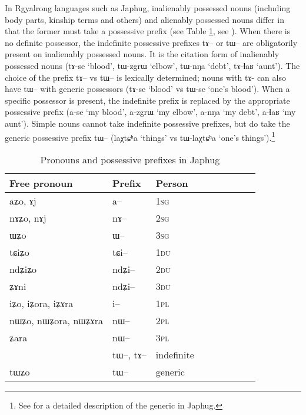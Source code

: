 \documentclass[oldfontcommands,oneside,a4paper,11pt]{article}
\newcommand{\ipa}[1]{{\phon #1}} %
\begin{document}
In Rgyalrong languages such as Japhug, inalienably possessed nouns (including body parts, kinship terms and others) and alienably possessed nouns differ in that the former must take a possessive prefix (see Table \ref{tab:pronoun}, see \citealt[1212]{jacques12incorp}). When there is no definite possessor, the indefinite possessive prefixes \ipa{tɤ--} or \ipa{tɯ--} are obligatorily present on inalienably possessed nouns. It is the citation form of inalienably possessed nouns (\ipa{tɤ-se} `blood', \ipa{tɯ-zgrɯ} `elbow', \ipa{tɯ-nŋa} `debt', \ipa{tɤ-ɬaʁ} `aunt'). The choice of the prefix \ipa{tɤ--} vs \ipa{tɯ--} is lexically determined; nouns with \ipa{tɤ-} can also have \ipa{tɯ--} with generic possessors (\ipa{tɤ-se} `blood' vs \ipa{tɯ-se} `one's blood').  When a specific possessor is present, the indefinite prefix is replaced by the appropriate possessive prefix (\ipa{a-se} `my blood', \ipa{a-zgrɯ} `my elbow', \ipa{a-nŋa} `my debt', \ipa{a-ɬaʁ} `my aunt').  Simple nouns cannot take indefinite possessive prefixes, but do take the generic possessive prefix \ipa{tɯ--} (\ipa{laχtɕʰa} `things' vs \ipa{tɯ-laχtɕʰa} `one's things').\footnote{See \citet{jacques15generic} for a detailed description of the generic in Japhug.}

\begin{table}[H] \centering
\caption{Pronouns and possessive prefixes in Japhug}\label{tab:pronoun}
\begin{tabular}{lllllllll} 
\toprule
 Free pronoun & Prefix & Person\\
\midrule
 \ipa{aʑo},    \ipa{ɤj} &	\ipa{a--}  &		1\textsc{sg} \\
\ipa{nɤʑo},  \ipa{nɤj} &	\ipa{nɤ--}  &			2\textsc{sg}\\
\ipa{ɯʑo}  &	\ipa{ɯ--}  &			3\textsc{sg}\\
\midrule
\ipa{tɕiʑo}  &	\ipa{tɕi--}  &			1\textsc{du} \\
\ipa{ndʑiʑo}  &	\ipa{ndʑi--}  &		2\textsc{du} \\	
\ipa{ʑɤni}  &	\ipa{ndʑi--}  &		3\textsc{du} \\	
\midrule
\ipa{iʑo}, \ipa{iʑora},   \ipa{iʑɤra}   &	\ipa{i--}  &			1\textsc{pl} \\
\ipa{nɯʑo}, \ipa{nɯʑora},   \ipa{nɯʑɤra}  &	\ipa{nɯ--}  &			2\textsc{pl} \\
\ipa{ʑara}  &	\ipa{nɯ--}  &			3\textsc{pl} \\
\midrule
&  \ipa{tɯ--},  \ipa{tɤ--} & indefinite \\
\ipa{tɯʑo} & \ipa{tɯ--}   &  generic\\
\bottomrule
\end{tabular}
\end{table}
\end{document}
